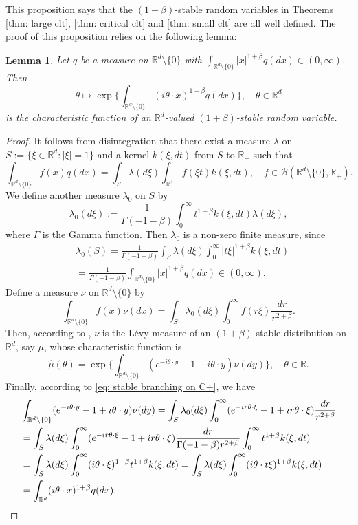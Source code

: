 \documentclass[12pt,a4paper]{amsart}
\theoremstyle{plain}
\newtheorem{lem}[thm]{Lemma}
\theoremstyle{definition}
\numberwithin{equation}{section}
\begin{document}
    This proposition says that the $(1+\beta)$-stable random variables  in Theorems \ref{thm: large clt}, \ref{thm: critical clt} and \ref{thm: small clt} are all well defined.
    The proof of this proposition relies on the following lemma:
\begin{lem}
\label{lem: charactreisticfunction}
    Let $q$ be a measure on $\mathbb R^d\setminus\{0\}$ with
    $\int_{\mathbb R^d\setminus\{0\}} |x|^{1+\beta} q(dx) \in (0,\infty)$.
    Then
\[
    \theta \mapsto  \exp\Big\{\int_{\mathbb R^d\setminus\{0\}} (i\theta \cdot x)^{1+\beta} q(dx)\Big\},
    \quad \theta \in \mathbb R^d
\]
    is the characteristic function of an $\mathbb R^d$-valued $(1+\beta)$-stable random variable.
\end{lem}
\begin{proof}
    It follows from disintegration that there exist a measure $\lambda$ on $S:= \{\xi\in \mathbb R^d:|\xi| = 1\}$ and a kernel $k(\xi,dt)$ from $S$ to $\mathbb R_+$ such that
\[
    \int_{\mathbb R^d\setminus \{0\}} f(x)q(dx) = \int_S \lambda(d\xi) \int_{\mathbb R^+} f(\xi t)k(\xi,dt),\quad
    f\in \mathcal B(\mathbb R^d\setminus \{0\}, \mathbb R_+).
\]
    We define another measure $\lambda_0$ on $S$ by
\[
    \lambda_0(d\xi) := \frac1{\Gamma(-1-\beta)}\int_0^\infty t^{1+\beta}k(\xi,dt) \lambda (d\xi),
\]
        where $\Gamma$ is the Gamma function.
    Then $\lambda_0$ is a non-zero finite measure, since
\begin{align}
    &\lambda_0(S) = \frac{1}{\Gamma(-1-\beta)} \int_S \lambda (d\xi) \int_0^\infty |t\xi|^{1+\beta}k(\xi,dt)
    \\&= \frac{1}{\Gamma(-1-\beta)} \int_{\mathbb R^d\setminus\{0\}} |x|^{1+\beta} q(dx) \in (0,\infty).
\end{align}
    Define a measure $\nu$ on $\mathbb R^d\setminus\{0\}$ by
\[
    \int_{\mathbb R^d\setminus\{0\}}f(x)\nu(dx)= \int_{S} \lambda_0(d\xi) \int_0^\infty f(r\xi) \frac{dr}{r^{2+\beta}} .
\]
        Then, according to \cite[Remark 14.4]{Sato2013Levy}, $\nu$ is the L\'evy measure of an $(1+\beta)$-stable distribution on $\mathbb R^d$, say $\mu$, whose characteristic function is
\[
    \hat \mu(\theta)
    =\exp\Big\{\int_{\mathbb R^d\setminus\{0\}} (e^{-i\theta \cdot y}-1+i\theta \cdot y) \nu(dy)\Big\},
    \quad \theta \in \mathbb R.
\]
	    Finally, according to \eqref{eq: stable branching on C+}, we have
\begin{align}
    &\int_{\mathbb R^d\setminus\{0\}} (e^{-i\theta \cdot y}-1+i\theta \cdot y) \nu(dy)
    = \int_S \lambda_0(d\xi) \int_0^\infty (e^{-ir\theta \cdot \xi}-1+ir\theta \cdot \xi) \frac{dr}{r^{2+\beta}}
    \\& = \int_S \lambda (d\xi) \int_0^\infty (e^{-ir\theta \cdot \xi}-1+ir\theta \cdot \xi) \frac{dr}{\Gamma(-1-\beta)r^{2+\beta}}\int_0^\infty t^{1+\beta} k(\xi,dt)
    \\& = \int_S \lambda (d\xi) \int_0^\infty (i\theta\cdot \xi)^{1+\beta} t^{1+\beta} k(\xi,dt)
    = \int_S \lambda(d\xi) \int_0^\infty (i\theta \cdot t\xi)^{1+\beta} k(\xi,dt)
    \\& = \int_{\mathbb R^d} (i\theta \cdot x)^{1+\beta} q(dx).
    \qedhere
\end{align}
\end{proof}
\end{document}
